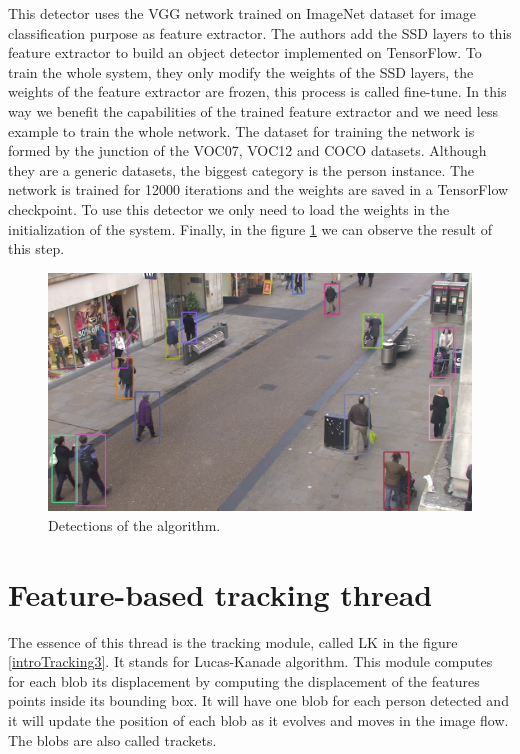 This detector uses the VGG network trained on ImageNet dataset for image classification purpose as feature extractor. The authors add the SSD layers to this feature extractor to build an object detector implemented on TensorFlow. To train the whole system, they only modify the weights of the SSD layers, the weights of the feature extractor are frozen, this process is called fine-tune. In this way we benefit the capabilities of the trained feature extractor and we need less example to train the whole network. The dataset for training the network is formed by the junction of the VOC07, VOC12 and COCO datasets. Although they are a generic datasets, the biggest category is the person instance. The network is trained for 12000 iterations and the weights are saved in a TensorFlow checkpoint. To use this detector we only need to load the weights in the initialization of the system. Finally, in the figure \ref{objectDetector1} we can observe the result of this step.

\begin{figure}[H]
\centering         
\includegraphics[width=\textwidth]{intro/deteccions.jpg}
\caption{Detections of the algorithm.} \label{objectDetector1}
\end{figure}

\section{Feature-based tracking thread}

The essence of this thread is the tracking module, called LK in the figure \ref{introTracking3}. It stands for Lucas-Kanade algorithm. This module computes for each blob its displacement by computing the displacement of the features points inside its bounding box. It will have one blob for each person detected and it will update the position of each blob as it evolves and moves in the image flow. The blobs are also called trackets.

